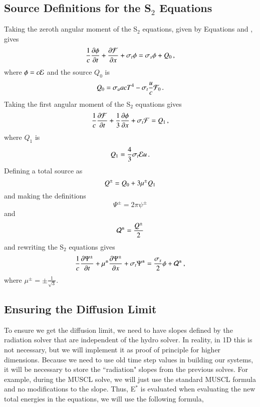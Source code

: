 \subsection{Source Definitions for the \texorpdfstring{S$_2$}{S-2} Equations}

Taking the zeroth angular moment of the S$_2$ equations, given by Equations
 and , gives
\begin{equation}
\frac{1}{c}\dydt{\phi} + \dydx{\F} + \sigma_t\phi = \sigma_s\phi + Q_0 \pec
\lequ{zerothmoment}
\end{equation}
where $\phi = c\mathcal{E}$ and the source $Q_0$ is
\begin{equation}
Q_0 = \sigma_a acT^4 - \sigma_t\frac{u}{c}\F_0 \pep
\lequ{Q0}
\end{equation}
Taking the first angular moment of the S$_2$ equations gives
\begin{equation}
\frac{1}{c}\dydt{\F} + \third\dydx{\phi} + \sigma_t\F = Q_1 \pec
\lequ{firstmoment}
\end{equation}
where $Q_1$ is
\begin{equation}
Q_1 = \frac{4}{3}\sigma_t\E u \pep
\lequ{Q1}
\end{equation}
Defining a total source as
\begin{equation}
Q^\pm = Q_0 + 3\mu^\pm Q_1
\lequ{Qdef}
\end{equation}
and making the definitions
\begin{equation}
  \Psi^\pm = 2\pi\psi^\pm
\end{equation}
and
\begin{equation}
  \mathcal{Q}^\pm = \frac{Q^\pm}{2}
\end{equation}
and rewriting the S$_2$ equations gives
\begin{equation}\lequ{S2Q}
  \frac{1}{c}\dydt{\Psi^\pm} + \mu^\pm\dydx{\Psi^\pm} + \sigma_t\Psi^\pm
  = \frac{\sigma_s}{2}\phi + \Q^\pm \pec
\end{equation}
where $\mu^\pm=\pm\frac{1}{\sqrt{3}}$.

\subsection{Ensuring the Diffusion Limit}\label{diffusion_limit}

To ensure we get the diffusion limit, we need to have slopes defined by the radiation
solver that are independent of the hydro solver.  In reality, in 1D this is not
necessary, but we will implement it as proof of principle for higher dimensions. Because we need to use
old time step values in building our systems, it will be necessary to store the
``radiation" slopes from the previous solves. For example, during the MUSCL solve, we
will just use the standard MUSCL formula and no modifications to the slope. Thus,
E$^*$ is evaluated when evaluating the new
total energies in the equations, we will use the following formula,

